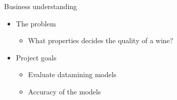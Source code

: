 \begin{frame}{Business understanding}
    \begin{itemize}
        \item The problem
        \begin{itemize}
            \item What properties decides the quality of a wine?
        \end{itemize}
        \item Project goals
        \begin{itemize}
            \item Evaluate datamining models
            \item Accuracy of the models
        \end{itemize}
    \end{itemize}
\end{frame}